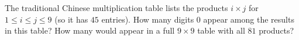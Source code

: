 The traditional Chinese multiplication table lists the products $i\times j$ for $1\le i\le j\le9$ (so it has $45$ entries). How many digits $0$ appear among the results in this table? How many would appear in a full $9\times9$ table with all $81$ products?
